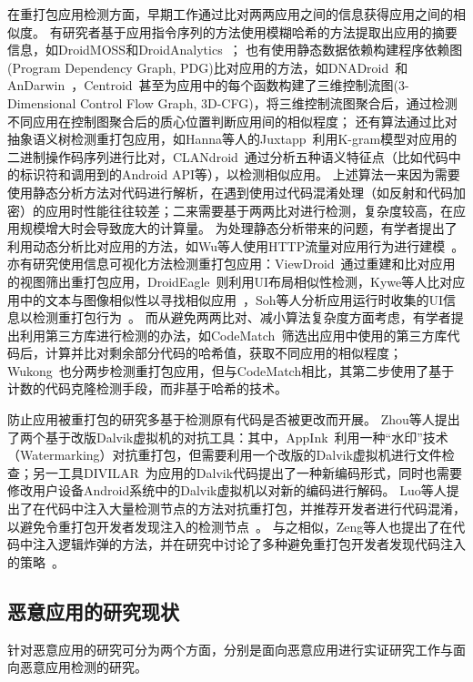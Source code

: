 在重打包应用检测方面，早期工作通过比对两两应用之间的信息获得应用之间的相似度。
有研究者基于应用指令序列的方法使用模糊哈希的方法提取出应用的摘要信息，如DroidMOSS和DroidAnalytics~\cite{DroidMOSS, Zheng2013DroidAnalyticsA}；
也有使用静态数据依赖构建程序依赖图(Program Dependency Graph, PDG)比对应用的方法，如DNADroid~\cite{DNADroid}和AnDarwin~\cite{AnDarwin}，Centroid~\cite{Centroid}甚至为应用中的每个函数构建了三维控制流图(3-Dimensional Control Flow Graph, 3D-CFG)，将三维控制流图聚合后，通过检测不同应用在控制图聚合后的质心位置判断应用间的相似程度；
还有算法通过比对抽象语义树检测重打包应用，如Hanna等人的Juxtapp~\cite{hanna2012juxtapp}利用K-gram模型对应用的二进制操作码序列进行比对，CLANdroid~\cite{CLANdroid}通过分析五种语义特征点（比如代码中的标识符和调用到的Android API等），以检测相似应用。
上述算法一来因为需要使用静态分析方法对代码进行解析，在遇到使用过代码混淆处理（如反射和代码加密）的应用时性能往往较差；二来需要基于两两比对进行检测，复杂度较高，在应用规模增大时会导致庞大的计算量。
为处理静态分析带来的问题，有学者提出了利用动态分析比对应用的方法，如Wu等人使用HTTP流量对应用行为进行建模~\cite{wu2015detect}。
亦有研究使用信息可视化方法检测重打包应用：ViewDroid~\cite{ViewDroid}通过重建和比对应用的视图筛出重打包应用，DroidEagle~\cite{sun2015droideagle}则利用UI布局相似性检测，Kywe等人比对应用中的文本与图像相似性以寻找相似应用~\cite{kywe2014detecting}，Soh等人分析应用运行时收集的UI信息以检测重打包行为~\cite{soh2015detecting}。
而从避免两两比对、减小算法复杂度方面考虑，有学者提出利用第三方库进行检测的办法，如CodeMatch~\cite{CodeMatch}筛选出应用中使用的第三方库代码后，计算并比对剩余部分代码的哈希值，获取不同应用的相似程度；Wukong~\cite{Wukong}也分两步检测重打包应用，但与CodeMatch相比，其第二步使用了基于计数的代码克隆检测手段，而非基于哈希的技术。

防止应用被重打包的研究多基于检测原有代码是否被更改而开展。
Zhou等人提出了两个基于改版Dalvik虚拟机的对抗工具：其中，AppInk~\cite{zhou2013appink}利用一种``水印''技术（Watermarking）对抗重打包，但需要利用一个改版的Dalvik虚拟机进行文件检查；另一工具DIVILAR~\cite{zhou2014divilar}为应用的Dalvik代码提出了一种新编码形式，同时也需要修改用户设备Android系统中的Dalvik虚拟机以对新的编码进行解码。
Luo等人提出了在代码中注入大量检测节点的方法对抗重打包，并推荐开发者进行代码混淆，以避免令重打包开发者发现注入的检测节点~\cite{luo2016repackage}。
与之相似，Zeng等人也提出了在代码中注入逻辑炸弹的方法，并在研究中讨论了多种避免重打包开发者发现代码注入的策略~\cite{zeng2018resilient}。

\subsection{恶意应用的研究现状}
针对恶意应用的研究可分为两个方面，分别是面向恶意应用进行实证研究工作与面向恶意应用检测的研究。

